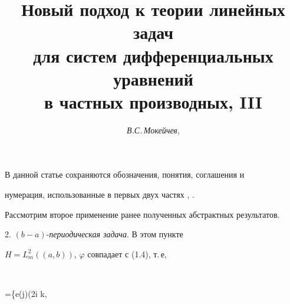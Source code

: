 









 


\author{\it В.С.\,Мокейчев, }   




\title{Новый подход к теории линейных задач\\   


для систем дифференциальных уравнений\\   


в частных производных, III} 


 


\date{} 




\pagestyle{plain} %


 




\maketitle 


\label{begin} 


 


В данной статье сохраняются обозначения, понятия, соглашения и 


нумерация, использованные в первых двух частях \cite{1}, \cite{2}. 


Рассмотрим второе применение ранее полученных абстрактных результатов. 


\medskip 


 


2. $(b{-}a)$-{\it периодическая задача}. В этом пункте 


$H=L^2_m((a,b))$, $\varphi$ совпадает с (1.4), т.\,е, 


$$ 


\varphi=\{e(j)\exp(2\pi i k\bullet{}, 


